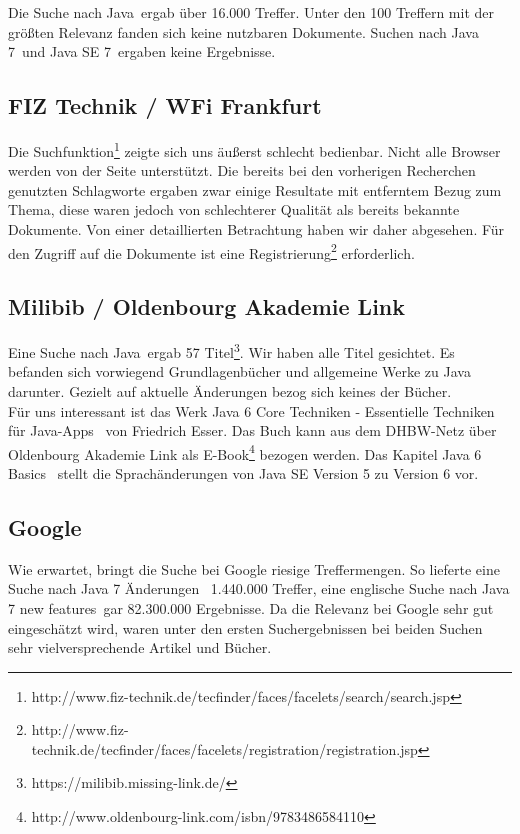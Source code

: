 Die Suche nach \glqq Java\grqq ~ergab über 16.000 Treffer. Unter den 100 Treffern mit der größten Relevanz fanden sich keine nutzbaren Dokumente. Suchen nach \glqq Java 7\grqq ~und \glqq Java SE 7\grqq ~ergaben keine Ergebnisse.

\subsection*{FIZ Technik / WFi Frankfurt}
Die Suchfunktion\footnote{http://www.fiz-technik.de/tecfinder/faces/facelets/search/search.jsp} zeigte sich uns äußerst schlecht bedienbar. Nicht alle Browser werden von der Seite unterstützt. Die bereits bei den vorherigen Recherchen genutzten Schlagworte ergaben zwar einige Resultate mit entferntem Bezug zum Thema, diese waren jedoch von schlechterer Qualität als bereits bekannte Dokumente. Von einer detaillierten Betrachtung haben wir daher abgesehen.
Für den Zugriff auf die Dokumente ist eine Registrierung\footnote{http://www.fiz-technik.de/tecfinder/faces/facelets/registration/registration.jsp} erforderlich.

\subsection*{Milibib / Oldenbourg Akademie Link}
Eine Suche nach \glqq Java\grqq ~ergab 57 Titel\footnote{https://milibib.missing-link.de/}. Wir haben alle Titel gesichtet. Es befanden sich vorwiegend Grundlagenbücher und allgemeine Werke zu Java darunter. Gezielt auf aktuelle Änderungen bezog sich keines der Bücher.\\

Für uns interessant ist das Werk \glqq Java 6 Core Techniken - Essentielle Techniken für Java-Apps\grqq\cite{java6core} ~von Friedrich Esser. Das Buch kann aus dem DHBW-Netz über Oldenbourg Akademie Link als E-Book\footnote{http://www.oldenbourg-link.com/isbn/9783486584110} bezogen werden. Das Kapitel \glqq Java 6 Basics\grqq\cite{java6core} ~stellt die Sprachänderungen von Java SE Version 5 zu Version 6 vor.

\subsection*{Google}
Wie erwartet, bringt die Suche bei Google riesige Treffermengen. So lieferte eine Suche nach \glqq Java 7 Änderungen\grqq~
1.440.000 Treffer, eine englische Suche nach \glqq Java 7 new features\grqq~gar 82.300.000 Ergebnisse. Da die Relevanz bei
Google sehr gut eingeschätzt wird, waren unter den ersten Suchergebnissen bei beiden Suchen sehr vielversprechende Artikel
und Bücher.\\

